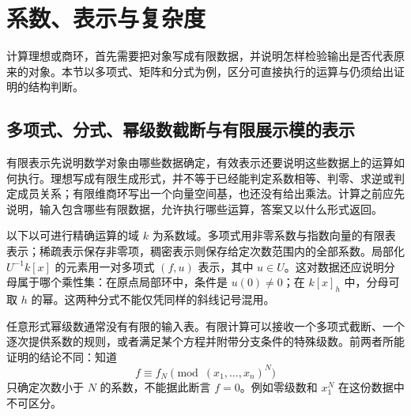 
\section{系数、表示与复杂度}
\label{b3:sec:B01}

计算理想或商环，首先需要把对象写成有限数据，并说明怎样检验输出是否代表原来的对象。本节以多项式、矩阵和分式为例，区分可直接执行的运算与仍须给出证明的结构判断。

%
%
%


\subsection{多项式、分式、幂级数截断与有限展示模的表示}
\label{b3:subsec:B01:01}

有限表示先说明数学对象由哪些数据确定，有效表示还要说明这些数据上的运算如何执行。理想写成有限生成形式，并不等于已经能判定系数相等、判零、求逆或判定成员关系；有限维商环写出一个向量空间基，也还没有给出乘法。计算之前应先说明，输入包含哪些有限数据，允许执行哪些运算，答案又以什么形式返回。

\ProseParagraphBreak
以下以可进行精确运算的域 \(k\) 为系数域。多项式用非零系数与指数向量的有限表表示；稀疏表示保存非零项，稠密表示则保存给定次数范围内的全部系数。局部化 \(U^{-1}k[x]\) 的元素用一对多项式 \((f,u)\) 表示，其中 \(u\in U\)。这对数据还应说明分母属于哪个乘性集：在原点局部环中，条件是 \(u(0)\ne0\)；在 \(k[x]_h\) 中，分母可取 \(h\) 的幂。这两种分式不能仅凭同样的斜线记号混用。

\ProseParagraphBreak
任意形式幂级数通常没有有限的输入表。有限计算可以接收一个多项式截断、一个逐次提供系数的规则，或者满足某个方程并附带分支条件的特殊级数。前两者所能证明的结论不同：知道
\[
	f\equiv f_N\pmod{(x_1,\ldots,x_n)^N}
\]
只确定次数小于 \(N\) 的系数，不能据此断言 \(f=0\)。例如零级数和 \(x_1^N\) 在这份数据中不可区分。

